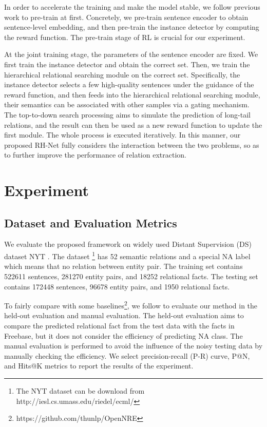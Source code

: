 \documentclass{article}
\begin{document}
In order to accelerate the training and make the model stable, we follow previous work \cite{Feng2018Reinforcement,Qin2018Robust} to pre-train at first. Concretely, we pre-train sentence encoder to obtain sentence-level embedding, and then pre-train the instance detector by computing the reward function. The pre-train stage of RL is crucial for our experiment. 

At the joint training stage, the parameters of the sentence encoder are fixed. We first train the instance detector and obtain the correct set. Then, we train the hierarchical relational searching module on the correct set. Specifically, the instance detector selects a few high-quality sentences under the guidance of the reward function, and then feeds into the hierarchical relational searching module, their semantics can be associated with other samples via a gating mechanism. The top-to-down search processing aims to simulate the prediction of long-tail relations, and the result can then be used as a new reward function to update the first module. The whole process is executed iteratively. In this manner, our proposed RH-Net fully considers the interaction between the two problems, so as to further improve the performance of relation extraction.

\section{Experiment}
\subsection{Dataset and Evaluation Metrics}

We evaluate the proposed framework on widely used Distant Supervision (DS) dataset NYT \cite{riedel2010modeling}. The dataset \footnote{The NYT dataset can be download from http://iesl.cs.umass.edu/riedel/ecml/} has 52 semantic relations and a special NA label which means that no relation between entity pair. The training set contains 522611 sentences, 281270 entity pairs, and 18252 relational facts. The testing set contains 172448 sentences, 96678 entity pairs, and 1950 relational facts.

To fairly compare with some baselines\footnote{https://github.com/thunlp/OpenNRE}, we follow \cite{Lin2016Neural} to evaluate our method in the held-out evaluation and manual evaluation. The held-out evaluation aims to compare the predicted relational fact from the test data with the facts in Freebase, but it does not consider the efficiency of predicting NA class. The manual evaluation is performed to avoid the influence of the noisy testing data by manually checking the efficiency. We select precision-recall (P-R) curve, P@N, and Hits@K metrics to report the results of the experiment.
\end{document}
